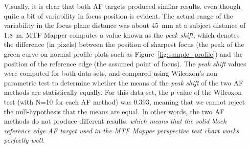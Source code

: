 \documentclass[a4paper]{article}
\begin{document}
Visually, it is clear that both AF targets produced similar results, even
though quite a bit of variability in focus position is evident. The actual
range of the variability in the focus plane distance was about 45~mm at a
subject  distance of 1.8~m.
MTF Mapper computes a value known as the \emph{peak shift}, which denotes the
difference (in pixels) between the position of sharpest focus (the peak of
the green curve on normal profile plots such as
Figure~\ref{fig:sample_profile}) and the position of the reference edge (the
assumed point of focus). The \emph{peak shift} values were computed for both
data sets, and compared using Wilcoxon's non-parametric test to determine
whether the means of the \emph{peak shift} of the two AF methods are
statistically equally. For this data set, the p-value of the Wilcoxon test
(with N=10 for each AF method) was 0.393, meaning that we cannot reject the
null-hypothesis that the means are equal. In other words, the two AF methods
do not produce different results, \emph{which means that the solid block reference
edge AF target used in the MTF Mapper perspective test chart works perfectly
well.}
\end{document}
